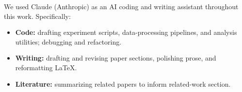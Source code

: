 We used Claude (Anthropic) as an AI coding and writing assistant
throughout this work. Specifically:
\begin{itemize}
    \item \textbf{Code:} drafting experiment scripts, data-processing
    pipelines, and analysis utilities; debugging and refactoring.
    \item \textbf{Writing:} drafting and revising paper sections,
    polishing prose, and reformatting LaTeX.
    \item \textbf{Literature:} summarizing related papers to inform
    related-work section.
\end{itemize}
